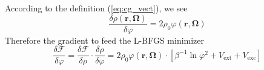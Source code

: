 According to the definition (\ref{eq:cg_vect}), we see
\begin{equation}
\frac{\delta\rho(\mathbf{r},\mathbf{\Omega})}{\delta\varphi}=2\rho_{0}\varphi(\mathbf{r},\mathbf{\Omega})
\end{equation}
Therefore the gradient to feed the L-BFGS minimizer
\begin{equation}
\frac{\delta\mathcal{F}}{\delta\varphi}=\frac{\delta\mathcal{F}}{\delta\rho}\cdot\frac{\delta\rho}{\delta\varphi}=2\rho_{0}\varphi(\mathbf{r},\mathbf{\Omega})\cdot\left[\beta^{-1}\ln\varphi^{2}+V_{\mathrm{ext}}+V_{\mathrm{exc}}\right]
\end{equation}

